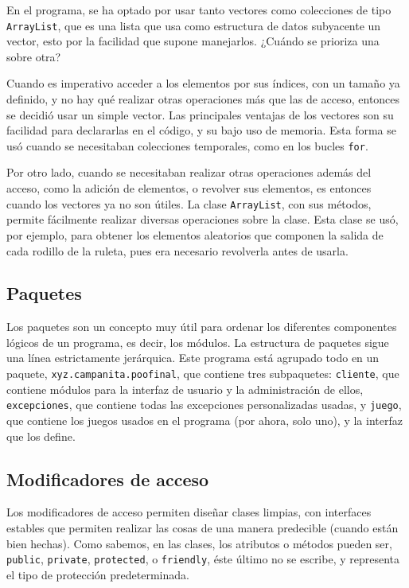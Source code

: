 \documentclass[letterpaper,12pt]{article}
\begin{document}
En el programa, se ha optado por usar tanto vectores como colecciones de tipo \texttt{ArrayList}, que es una lista que usa como estructura de datos subyacente un vector, esto por la facilidad que supone manejarlos. ¿Cuándo se prioriza una sobre otra?

\begin{description}[style=nextline]
\item[Vectores]
Cuando es imperativo acceder a los elementos por sus índices, con un tamaño ya definido, y no hay qué realizar otras operaciones más que las de acceso, entonces se decidió usar un simple vector. Las principales ventajas de los vectores son su facilidad para declararlas en el código, y su bajo uso de memoria. Esta forma se usó cuando se necesitaban colecciones temporales, como en los bucles \texttt{for}.

\item[\texttt{ArrayList}]
Por otro lado, cuando se necesitaban realizar otras operaciones además del acceso, como la adición de elementos, o revolver sus elementos, es entonces cuando los vectores ya no son útiles. La clase \texttt{ArrayList}, con sus métodos, permite fácilmente realizar diversas operaciones sobre la clase. Esta clase se usó, por ejemplo, para obtener los elementos aleatorios que componen la salida de cada rodillo de la ruleta, pues era necesario revolverla antes de usarla.
\end{description}

\subsection{Paquetes}
Los paquetes son un concepto muy útil para ordenar los diferentes componentes lógicos de un programa, es decir, los módulos. La estructura de paquetes sigue una línea estrictamente jerárquica. Este programa está agrupado todo en un paquete, \texttt{xyz.campanita.poofinal}, que contiene tres subpaquetes: \texttt{cliente}, que contiene módulos para la interfaz de usuario y la administración de ellos, \texttt{excepciones}, que contiene todas las excepciones personalizadas usadas, y \texttt{juego}, que contiene los juegos usados en el programa (por ahora, solo uno), y la interfaz que los define.

\subsection{Modificadores de acceso}
Los modificadores de acceso permiten diseñar clases limpias, con interfaces estables que permiten realizar las  cosas de una manera predecible (cuando están bien hechas). Como sabemos, en las clases, los atributos o métodos pueden ser, \texttt{public}, \texttt{private}, \texttt{protected}, o \texttt{friendly}, éste último no se escribe, y representa el tipo de protección predeterminada.
\end{document}
